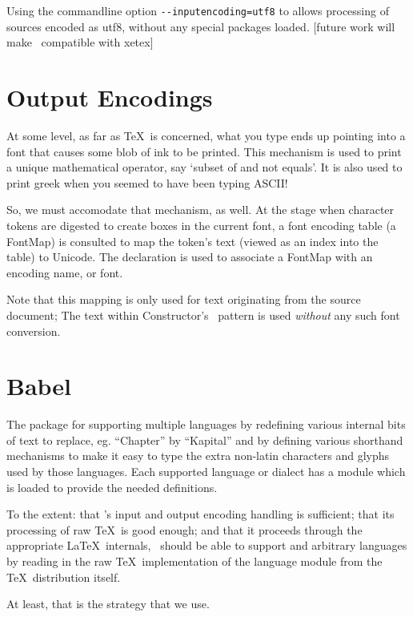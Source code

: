 \documentclass{book}
\newcommand{\shellcode}{\lstinline[style=shell]}
\begin{document}
Using the commandline option \shellcode{--inputencoding=utf8} to  allows
processing of sources encoded as utf8, without any special packages loaded.
[future work will make \LaTeXML\ compatible with xetex]

\section{Output Encodings}\label{localization.outputencodings}
At some level, as far as \TeX\ is concerned, what you type ends up pointing into a font
that causes some blob of ink to be printed. This mechanism is used to print
a unique mathematical operator, say `subset of and not equals'.  It is also used
to print greek when you seemed to have been typing ASCII!

So, we must accomodate that mechanism, as well.
At the stage when character tokens are digested to create boxes in the current font,
a font encoding table (a FontMap) is consulted to map the token's text (viewed as an
index into the table) to Unicode.  The declaration  is used to associate
a FontMap with an encoding name, or font.

Note that this mapping is only used for text originating from the source
document; The text within Constructor's \XML\ pattern is used \emph{without} any such font conversion.

\section{Babel}\label{localization.babel}
The  package for supporting multiple languages by redefining various
internal bits of text to replace, eg. ``Chapter'' by ``Kapital'' and by
defining various shorthand mechanisms to make it easy to type the extra
non-latin characters and glyphs used by those languages.  Each supported
language or dialect has a module which is loaded to provide the needed definitions.

To the extent: that \LaTeXML's input and output encoding handling is sufficient;
that its processing of raw \TeX\ is good enough; and that it proceeds
through the appropriate \LaTeX\ internals, \LaTeXML\ should be able to
support  and arbitrary languages by reading in the raw \TeX\
implementation of the language module from the \TeX\ distribution itself.

At least, that is the strategy that we use.

\end{document}
